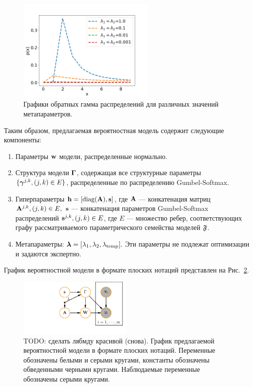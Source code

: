 \begin{figure}
\centering
\includegraphics[width=0.6\textwidth]{plots/notebooks/invgamma.png}
\caption{Графики обратных гамма распределений для различных значений метапараметров.}
\label{fig:inv-gamma}
\end{figure}


Таким образом, предлагаемая вероятностная модель содержит следующие компоненты:
\begin{enumerate}
\item Параметры $\mathbf{w}$ модели, распределенные нормально.
\item Структура модели $\boldsymbol{\Gamma}$, содержащая все структурные параметры $\{\boldsymbol{\gamma}^{j,k}, (j,k) \in E\}$, распределенные по распределению Gumbel-Softmax.
\item Гиперпараметры $\mathbf{h} = [\text{diag}(\mathbf{A}), \mathbf{s}]$, где $\mathbf{A}$ --- конкатенация матриц $\mathbf{A}^{j,k}, (j,k) \in E,$ $\mathbf{s}$ --- конкатенация параметров Gumbel-Softmax распределений $\mathbf{s}^{j,k}, (j,k) \in E$, где $E$ --- множество ребер, соответствующих графу рассматриваемого параметрического семейства моделей $\mathfrak{F}$.
\item Метапараметры: $\boldsymbol{\lambda} = [\lambda_1, \lambda_2, \lambda_{\text{temp}}].$ Эти параметры не подлежат оптимизации и задаются экспертно. 
\end{enumerate}

График вероятностной модели в формате плоских нотаций представлен на Рис.~\ref{fig:plate_prob}.
\begin{figure}
\centering
   \includegraphics[width=0.5\textwidth]{plots/notebooks/simple_plate.pdf}
\caption{TODO: сделать лябмду красивой (снова). График предлагаемой вероятностной модели в формате плоских нотаций. Переменные обозначены белыми и серыми кругами, константы обозначены обведенными черными кругами. Наблюдаемые переменные обозначены серыми кругами.}
\label{fig:plate_prob}
\end{figure}

